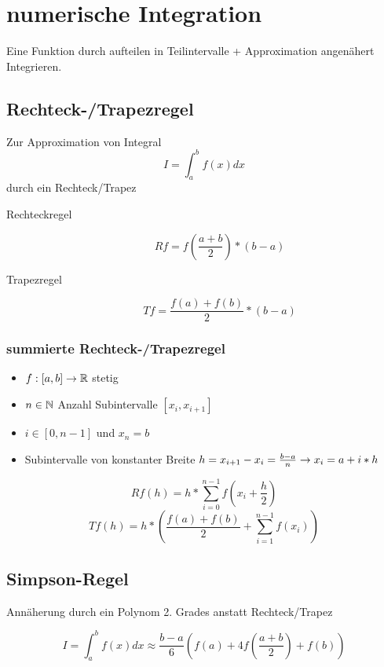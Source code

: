\section{numerische Integration}

Eine Funktion durch aufteilen in Teilintervalle + Approximation angenähert
Integrieren.

\subsection{Rechteck-/Trapezregel}

Zur Approximation von Integral $$I = \int_a^b{f(x) dx}$$ durch ein Rechteck/Trapez

{\large
\begin{description}
	\item[Rechteckregel] $$Rf = f(\frac{a+b}{2}) * (b - a)$$
	\item[Trapezregel] $$Tf = \frac{f(a)+f(b)}{2} * (b - a)$$
\end{description}
}



\subsubsection{summierte Rechteck-/Trapezregel}

\begin{itemize}
	\item $f : [a, b] \to \mathbb{R}$ stetig
	\item $n \in \mathbb{N}$ Anzahl Subintervalle $[x_i, x_{i+1}]$
	\item $i \in [0, n-1]$ und $x_n = b$
	\item Subintervalle von konstanter Breite $h = x_{i+1} - x_i
		      = \frac{b-a}{n} \rightarrow x_i = a + i * h$
\end{itemize}

{\large
$$Rf(h) = h * \sum_{i=0}^{n-1}{f(x_i + \frac{h}{2})}$$
$$Tf(h) = h * \left(\frac{f(a) + f(b)}{2} + \sum_{i=1}^{n-1}{f(x_i)}\right)$$
}





\subsection{Simpson-Regel}

Annäherung durch ein Polynom 2. Grades anstatt Rechteck/Trapez



{\large
$$I = \int_a^b{f(x) dx}
	\approx \frac{b-a}{6} \left(f(a) + 4f(\frac{a+b}{2}) + f(b)\right)$$
}


